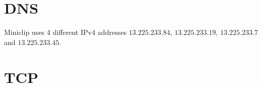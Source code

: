 \documentclass{article}
\begin{document}
\section{DNS}
\label{sec:DNS}



Miniclip uses 4 different IPv4 addresses $13.225.233.84$, $13.225.233.19$, $13.225.233.7$ and $13.225.233.45$. 

\section{TCP}
\label{sec:TCP}







\end{document}
